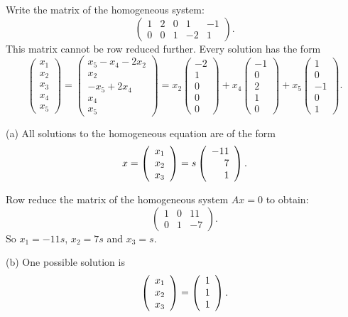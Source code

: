 \documentclass{ximera}
\begin{document}
\soln Write the matrix of the homogeneous system:
\[
\left(\begin{array}{rrrrr} 1 & 2 & 0 & 1 & -1 \\
0 & 0 & 1 & -2 & 1 \end{array}\right).
\]
This matrix cannot be row reduced further.  Every solution has the form
\[
\left(\begin{array}{r} x_1 \\ x_2 \\ x_3 \\ x_4 \\ x_5
\end{array}\right) = \left(\begin{array}{c} x_5 - x_4 - 2x_2 \\
x_2 \\ -x_5 + 2x_4 \\ x_4 \\ x_5 \end{array}\right) = 
x_2\left(\begin{array}{r} -2 \\ 1 \\ 0 \\ 0 \\ 0
\end{array}\right) + x_4\left(\begin{array}{r} -1 \\ 0 \\ 2 \\
1 \\ 0 \end{array}\right) + x_5\left(\begin{array}{r} 1 \\ 0 \\
-1 \\ 0 \\ 1 \end{array}\right).
\]

(a) \ans All solutions to the homogeneous equation are of the form
\[
x = \left(\begin{array}{r} x_1 \\ x_2 \\ x_3\end{array}\right) = s\left(\begin{array}{r} -11 \\ 7 \\ 1\end{array}\right).
\]

\soln Row reduce the matrix of the homogeneous system
$Ax = 0$ to obtain:
\[
\left(\begin{array}{rrr} 1 & 0 & 11 \\ 0 & 1 & -7 \end{array}\right).
\]
So $x_1 = -11s$, $x_2 = 7s$ and $x_3 = s$.

(b) \ans One possible solution is
\[ \left(\begin{array}{r} x_1 \\ x_2 \\ x_3\end{array}\right) = \left(\begin{array}{r} 1 \\ 1 \\ 1\end{array}\right). \]
\end{document}
